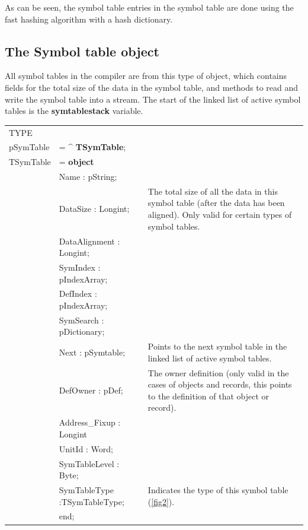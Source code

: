 \documentclass [a4paper,12pt]{article}
\begin{document}
As can be seen, the symbol table entries in the symbol table are done using
the fast hashing algorithm with a hash dictionary.

\subsection{The Symbol table object}
\label{subsec:mylabel3}

All symbol tables in the compiler are from this type of object, which
contains fields for the total size of the data in the symbol table, and
methods to read and write the symbol table into a stream. The start of the
linked list of active symbol tables is the \textbf{symtablestack} variable.

\begin{tabular*}{6.5in}{|l@{\extracolsep{\fill}}lp{}|}
\hline
\textsf{TYPE} & & \\
\xspace \textsf{pSymTable} &= \^{} \textbf{TSymTable};&  \\
\xspace \textsf{TSymTable} &= \textbf{object} & \\
& \textsf{Name : pString;}& \\
& \textsf{DataSize : Longint;}&
	The total size of all the data in this symbol table (after the data has been aligned). Only valid for certain types of symbol tables. \\
& \textsf{DataAlignment : Longint;}& \\
& \textsf{SymIndex : pIndexArray;}& \\
& \textsf{DefIndex : pIndexArray;}&  \\
& \textsf{SymSearch : pDictionary;}& \\
& \textsf{Next : pSymtable;}&
	Points to the next symbol table in the linked list of active symbol tables. \\
& \textsf{DefOwner : pDef;}&
	The owner definition (only valid in the cases of objects and records, this points to the definition of that object or record). \\
& \textsf{Address{\_}Fixup : Longint}&  \\
& \textsf{UnitId : Word;}&  \\
& \textsf{SymTableLevel : Byte;}&  \\
& \textsf{SymTableType :TSymTableType;}&
	Indicates the type of this symbol table (\ref{fig2}). \\
&\textsf{end;}&  \\
\hline
\end{tabular*}
\end{document}
